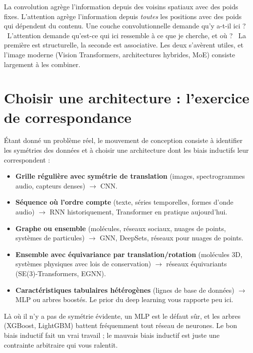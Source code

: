 \begin{intuition}
La convolution agrège l'information depuis des voisins spatiaux avec des poids fixes. L'attention agrège l'information depuis \emph{toutes} les positions avec des poids qui dépendent du contenu. Une couche convolutionnelle demande \og qu'y a-t-il ici ? \fg\ L'attention demande \og qu'est-ce qui ici ressemble à ce que je cherche, et où ? \fg\ La première est structurelle, la seconde est associative. Les deux s'avèrent utiles, et l'image moderne (Vision Transformers, architectures hybrides, MoE) consiste largement à les combiner.
\end{intuition}

\section{Choisir une architecture : l'exercice de correspondance}

Étant donné un problème réel, le mouvement de conception consiste à identifier les symétries des données et à choisir une architecture dont les biais inductifs leur correspondent :

\begin{itemize}
  \item \textbf{Grille régulière avec symétrie de translation} (images, spectrogrammes audio, capteurs denses) $\to$ CNN.
  \item \textbf{Séquence où l'ordre compte} (texte, séries temporelles, formes d'onde audio) $\to$ RNN historiquement, Transformer en pratique aujourd'hui.
  \item \textbf{Graphe ou ensemble} (molécules, réseaux sociaux, nuages de points, systèmes de particules) $\to$ GNN, DeepSets, réseaux pour nuages de points.
  \item \textbf{Ensemble avec équivariance par translation/rotation} (molécules 3D, systèmes physiques avec lois de conservation) $\to$ réseaux équivariants (SE(3)-Transformers, EGNN).
  \item \textbf{Caractéristiques tabulaires hétérogènes} (lignes de base de données) $\to$ MLP ou arbres boostés. Le prior du deep learning vous rapporte peu ici.
\end{itemize}

Là où il n'y a pas de symétrie évidente, un MLP est le défaut sûr, et les arbres (XGBoost, LightGBM) battent fréquemment tout réseau de neurones. Le bon biais inductif fait un vrai travail ; le mauvais biais inductif est juste une contrainte arbitraire qui vous ralentit.

